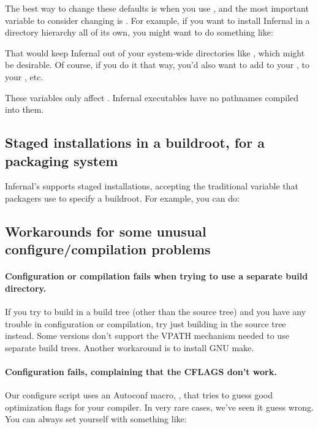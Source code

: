 The best way to change these defaults is when you use
, and the most important variable to consider
changing is . For example, if you want to install
Infernal in a directory hierarchy all of its own, you might want to do
something like:


That would keep Infernal out of your system-wide directories like
, which might be desirable. Of course, if you do
it that way, you'd also want to add  to
your ,  to your
, etc.

These variables only affect . Infernal executables
have no pathnames compiled into them.

\subsection{Staged installations in a buildroot, for a packaging system}

Infernal's  supports staged installations, accepting
the traditional  variable that packagers use to specify
a buildroot. For example, you can do:


\subsection{Workarounds for some unusual configure/compilation problems}

\paragraph{Configuration or compilation fails when trying to use a
  separate build directory.}  If you try to build in a build tree
(other than the source tree) and you have any trouble in configuration
or compilation, try just building in the source tree instead. Some
 versions don't support the VPATH mechanism needed to use
separate build trees. Another workaround is to install GNU make.

\paragraph{Configuration fails, complaining that the CFLAGS don't
  work.} Our configure script uses an Autoconf macro,
  , that tries to guess good optimization flags
  for your compiler. In very rare cases, we've seen it guess wrong.
  You can always set  yourself with something like:

